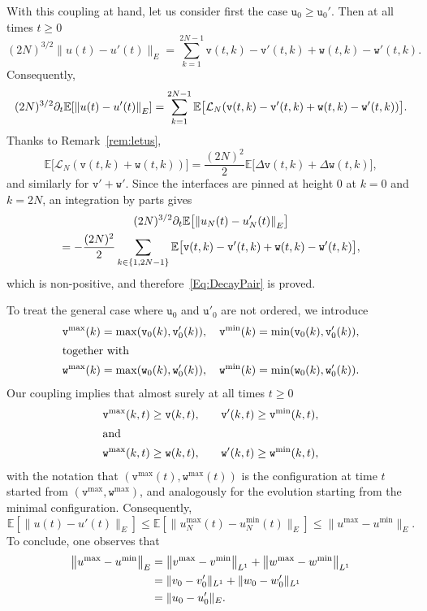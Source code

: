 \documentclass[10pt]{amsart}
\theoremstyle{definition}\newtheorem{defi}[theo]{Definition}\newtheorem{rema}[theo]{Remark}\newtheorem{exam}[theo]{Example}\newtheorem{exem}[theo]{Example}\newtheorem{nota}[theo]{Notation}
\theoremstyle{plain}
\newcommand{\ttv}{\mathtt{v}}
\newcommand{\ttw}{\mathtt{w}}
\newcommand{\tu}{\mathtt{u}}
\newcommand{\tv}{\mathtt{v}}
\newcommand{\Tw}{\mathtt{w}}
\newcommand{\cL}{\mathcal{L}}
\newcommand{\E}{\mathbb{E}}
\let\originalleft\left
\let\originalright\right
\renewcommand{\left}{\mathopen{}\mathclose\bgroup\originalleft}
\renewcommand{\right}{\aftergroup\egroup\originalright}
\begin{document}
With this coupling at hand, let us consider first the case $\tu_0 \ge \tu_0'$. Then at all times $t\ge 0$
\[
(2 N)^{3/2}\| u(t) - u'(t)\|_E = \sum_{k=1}^{2N-1} \ttv(t,k)-\ttv'(t,k) + \ttw(t,k)-\ttw'(t,k).
\]
Consequently,
\[
(2 N)^{3/2}\partial_t \E\left[\left\| u(t) - u'(t)\right\|_E\right] = \sum_{k=1}^{2N-1} \E\bigl[\cL_N\left(\ttv(t,k)-\ttv'(t,k) + \ttw(t,k)-\ttw'(t,k)\right) \bigr].
\]
Thanks to Remark~\ref{rem:letus},
\[
\E\big[\cL_N(\ttv(t,k)+ \ttw(t,k)) \big] =\frac{(2N)^2}{2}\E\big[\Delta \ttv(t,k) + \Delta \ttw(t,k) \big],
\]
and similarly for $\ttv' + \ttw'$. Since the interfaces are pinned at height $0$ at $k=0$ and $k=2N$, an integration by parts gives
\begin{multline*}
(2 N)^{3/2} \partial_t \E\bigl[\left\| u_N(t) - u_N'(t)\right\|_E\bigr]\\
= -\frac{(2N)^2}{2} \sum_{k\in \{1,2N-1\}} \E\big[\ttv(t,k)-\ttv'(t,k)+\ttw(t,k)-\ttw'(t,k)\big],
\end{multline*}
which is non-positive, and therefore~\eqref{Eq:DecayPair} is proved.

To treat the general case where $\tu_0$ and $\tu'_0$ are not ordered, we introduce
\begin{alignat*}{3}
\tv^{\max}(k) = \max(\tv_0(k),\tv_0'(k)),\quad \tv^{\min}(k) = \min(\tv_0(k),\tv_0'(k)),\\
\intertext{together with}
\Tw^{\max}(k) = \max(\Tw_0(k),\Tw_0'(k)),\quad \Tw^{\min}(k) = \min(\Tw_0(k),\Tw_0'(k)).
\end{alignat*}
Our coupling implies that almost surely at all times $t\ge 0$
\begin{alignat*}{3}
\ttv^{\max}(k,t) &\ge \ttv(k,t),\quad  &\ttv'(k,t) &\ge \ttv^{\min}(k,t),\\
\intertext{and}
\ttw^{\max}(k,t) &\ge \ttw(k,t),\quad &\ttw'(k,t) &\ge \ttw^{\min}(k,t),
\end{alignat*}
with the notation that $(\ttv^{\max}(t),\ttw^{\max}(t))$ is the configuration at time $t$ started from $(\ttv^{\max},\ttw^{\max})$, and analogously for the evolution starting from the minimal configuration. Consequently,
\[
\E[\|u(t) - u'(t) \|_{E}]\le \E[\|u_N^{\max}(t) - u_N^{\min}(t) \|_{E}] \le \|u^{\max} - u^{\min} \|_{E}.
\]
To conclude, one observes that
\begin{align*}
\left\|u^{\max} - u^{\min} \right\|_{E} &= \left\|v^{\max} - v^{\min} \right\|_{L^1} + \left\|w^{\max} - w^{\min}\right\|_{L^1}\\
&= \|v_0 - v'_0\|_{L^1} + \|w_0 - w'_0\|_{L^1}\\
&= \|u_0 - u_0'\|_E.
\end{align*}
\end{document}
